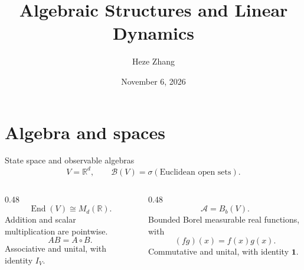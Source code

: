 \documentclass[12pt]{beamer}
\title[Algebra and Linear Dynamics]{Algebraic Structures and Linear Dynamics}
\author[H. Zhang]{Heze Zhang}
\date{November 6, 2026}
\newcommand{\R}{\mathbb R}
\newcommand{\End}{\operatorname{End}}
\begin{document}
\section{Algebra and spaces}

\begin{frame}[t]{State space and observable algebras}
  \begin{equation*}
    V=\R^d,\qquad \mathcal B(V)=\sigma(\text{Euclidean open sets}).
  \end{equation*}
  \vspace{-2mm}
  \begin{columns}[T,onlytextwidth]
    \begin{column}{0.48\textwidth}
      \begin{equation*}
        \End(V)\cong M_d(\R).
      \end{equation*}
      Addition and scalar\\multiplication are pointwise.
      \begin{equation*}
        AB=A\circ B.
      \end{equation*}
      Associative and unital, with identity $I_V$.
    \end{column}
    \begin{column}{0.48\textwidth}
      \begin{equation*}
        \mathcal A=B_b(V).
      \end{equation*}
      Bounded Borel measurable real functions, with
      \begin{equation*}
        (fg)(x)=f(x)g(x).
      \end{equation*}
      Commutative and unital, with identity $\mathbf1$.
    \end{column}
  \end{columns}
\end{frame}
\end{document}
